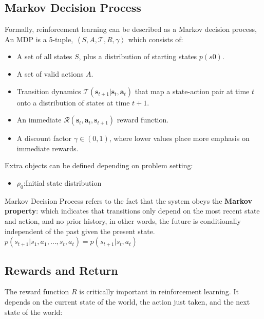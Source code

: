 


\subsection{Markov Decision Process}
Formally, reinforcement learning can be described as a Markov decision process, An MDP is a 5-tuple, $ \left\langle S, A, \mathcal{T}, R, \gamma \right\rangle $ which consists of:

\begin{itemize}
		\item A set of all states \(S\), plus a distribution of starting states \(p(s0)\).
		\item A set of valid actions \(A\).
		\item Transition dynamics $ \mathcal{T}\left(\mathbf{s}_{t+1} | \mathbf{s}_{t}, \mathbf{a}_{t}\right) $ that map a state-action pair at time \(t\) onto a distribution of states at time \(t+1\).
		\item An immediate $ \mathcal{R}\left(\mathbf{s}_{t}, \mathbf{a}_{t}, \mathbf{s}_{t+1}\right) $ reward function.
		\item A discount factor \(\gamma \in(0,1)\), where lower values place more emphasis on immediate rewards.
\end{itemize}

Extra objects can be defined depending on problem setting:
\begin{itemize}
		\item $\rho_0$:Initial state distribution
\end{itemize}

Markov Decision Process refers to the fact that the system obeys the \textbf{Markov property}: which indicates that transitions only depend on the most recent state and action, and no prior history, in other words, the future is conditionally independent of the past given the present state. $ p\left(s_{t+1} | s_{1}, a_{1}, \ldots, s_{t}, a_{t}\right)=p\left(s_{t+1} | s_{t}, a_{t}\right) $


\subsection{Rewards and Return}

The reward function \(R\) is critically important in reinforcement learning. It depends on the current state of the world, the action just taken, and the next state of the world:

